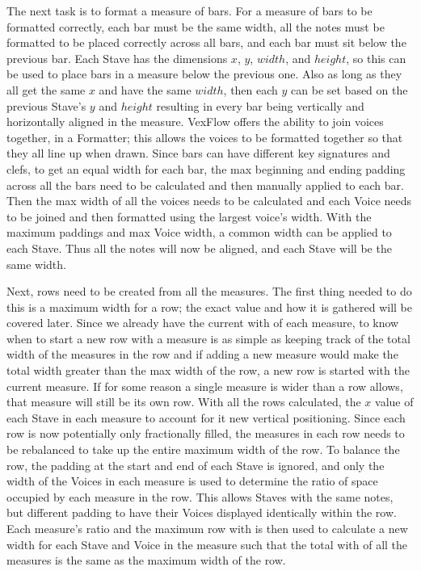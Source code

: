 \documentclass[letterpaper,12pt]{article}
\begin{document}
The next task is to format a measure of bars. For a measure of bars to be formatted correctly, each bar must be the same
width, all the notes must be formatted to be placed correctly across all bars, and each bar must sit below the previous
bar. Each Stave has the dimensions $ x $, $ y $, $ width $, and $ height $, so this can be used to place bars in a
measure below the previous one. Also as long as they all get the same $ x $ and have the same $ width $, then each $ y $
can be set based on the previous Stave's $ y $ and $ height $ resulting in every bar being vertically and horizontally
aligned in the measure. VexFlow offers the ability to join voices together, in a Formatter; this allows the voices to be
formatted together so that they all line up when drawn. Since bars can have different key signatures and clefs, to get
an equal width for each bar, the max beginning and ending padding across all the bars need to be calculated and then
manually applied to each bar. Then the max width of all the voices needs to be calculated and each Voice needs to be
joined and then formatted using the largest voice's width. With the maximum paddings and max Voice width, a common width
can be applied to each Stave. Thus all the notes will now be aligned, and each Stave will be the same width.

Next, rows need to be created from all the measures. The first thing needed to do this is a maximum width for a row; the
exact value and how it is gathered will be covered later. Since we already have the current with of each measure, to
know when to start a new row with a measure is as simple as keeping track of the total width of the measures in the row
and if adding a new measure would make the total width greater than the max width of the row, a new row is started with
the current measure. If for some reason a single measure is wider than a row allows, that measure will still be its own
row. With all the rows calculated, the $ x $ value of each Stave in each measure to account for it new vertical
positioning. Since each row is now potentially only fractionally filled, the measures in each row needs to be rebalanced
to take up the entire maximum width of the row. To balance the row, the padding at the start and end of each Stave is
ignored, and only the width of the Voices in each measure is used to determine the ratio of space occupied by each
measure in the row. This allows Staves with the same notes, but different padding to have their Voices displayed
identically within the row. Each measure's ratio and the maximum row with is then used to calculate a new width for each
Stave and Voice in the measure such that the total with of all the measures is the same as the maximum width of the row.
\end{document}
